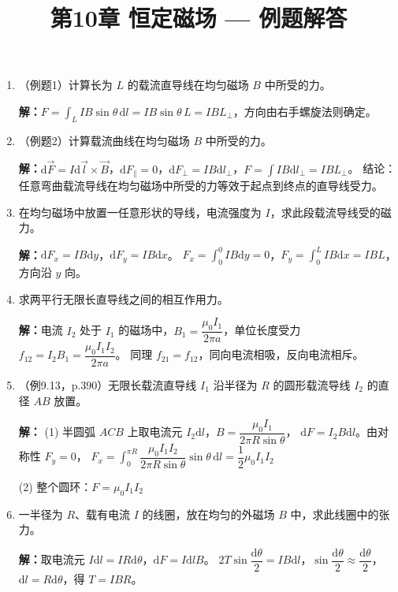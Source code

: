 \documentclass{ctexart}
\title{\textbf{第10章 恒定磁场} --- 例题解答}
\author{}
\date{}
\begin{document}
\maketitle

\begin{enumerate}

\item（例题1）计算长为 $L$ 的载流直导线在均匀磁场 $B$ 中所受的力。

\textbf{解：}$F = \displaystyle\int_L IB\sin\theta\,\mathrm{d}l = IB\sin\theta\,L = IBL_{\perp}$，方向由右手螺旋法则确定。

\item（例题2）计算载流曲线在均匀磁场 $B$ 中所受的力。

\textbf{解：}$\mathrm{d}\vec{F} = I\mathrm{d}\vec{l}\times\vec{B}$，$\mathrm{d}F_{\parallel} = 0$，$\mathrm{d}F_{\perp} = IB\mathrm{d}l_{\perp}$，$F = \displaystyle\int IB\mathrm{d}l_{\perp} = IBL_{\perp}$。
结论：任意弯曲载流导线在均匀磁场中所受的力等效于起点到终点的直导线受力。

\item 在均匀磁场中放置一任意形状的导线，电流强度为 $I$，求此段载流导线受的磁力。

\textbf{解：}$\mathrm{d}F_x = IB\mathrm{d}y$，$\mathrm{d}F_y = IB\mathrm{d}x$。
$F_x = \displaystyle\int_0^0 IB\mathrm{d}y = 0$，$F_y = \displaystyle\int_0^L IB\mathrm{d}x = IBL$，方向沿 $y$ 向。

\item 求两平行无限长直导线之间的相互作用力。

\textbf{解：}电流 $I_2$ 处于 $I_1$ 的磁场中，$B_1 = \dfrac{\mu_0 I_1}{2\pi a}$，单位长度受力 $f_{12} = I_2B_1 = \dfrac{\mu_0 I_1 I_2}{2\pi a}$。
同理 $f_{21} = f_{12}$，同向电流相吸，反向电流相斥。

\item（例9.13，p.390）无限长载流直导线 $I_1$ 沿半径为 $R$ 的圆形载流导线 $I_2$ 的直径 $AB$ 放置。

\textbf{解：}
(1) 半圆弧 $ACB$ 上取电流元 $I_2\mathrm{d}l$，$B = \dfrac{\mu_0 I_1}{2\pi R\sin\theta}$，
$\mathrm{d}F = I_2B\mathrm{d}l$。由对称性 $F_y = 0$，
$F_x = \displaystyle\int_0^{\pi R} \dfrac{\mu_0 I_1 I_2}{2\pi R\sin\theta}\sin\theta\,\mathrm{d}l = \dfrac12 \mu_0 I_1 I_2$

(2) 整个圆环：$F = \mu_0 I_1 I_2$

\item 一半径为 $R$、载有电流 $I$ 的线圈，放在均匀的外磁场 $B$ 中，求此线圈中的张力。

\textbf{解：}取电流元 $I\mathrm{d}l = IR\mathrm{d}\theta$，$\mathrm{d}F = I\mathrm{d}lB$。
$2T\sin\dfrac{\mathrm{d}\theta}{2} = IB\mathrm{d}l$，$\sin\dfrac{\mathrm{d}\theta}{2} \approx \dfrac{\mathrm{d}\theta}{2}$，$\mathrm{d}l = R\mathrm{d}\theta$，得 $T = IBR$。


\end{enumerate}
\end{document}
